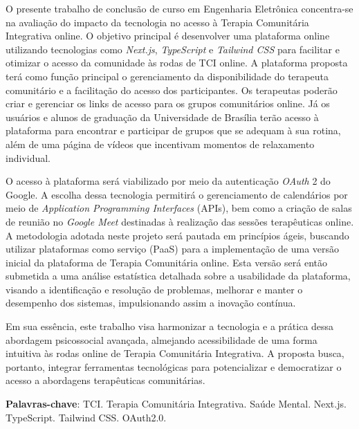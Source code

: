 \begin{resumo}
    O presente trabalho de conclusão de curso em Engenharia Eletrônica concentra-se na avaliação do impacto da tecnologia no acesso à Terapia Comunitária Integrativa online. O objetivo principal é desenvolver uma plataforma online utilizando tecnologias como \textit{Next.js}, \textit{TypeScript} e \textit{Tailwind CSS} para facilitar e otimizar o acesso da comunidade às rodas de TCI online. A plataforma proposta terá como função principal o gerenciamento da disponibilidade do terapeuta comunitário e a facilitação do acesso dos participantes. Os terapeutas poderão criar e gerenciar os links de acesso para os grupos comunitários online. Já os usuários e alunos de graduação da Universidade de Brasília terão acesso à plataforma para encontrar e participar de grupos que se adequam à sua rotina, além de uma página de vídeos que incentivam momentos de relaxamento individual.

    O acesso à plataforma será viabilizado por meio da autenticação \textit{OAuth} 2 do Google. A escolha dessa tecnologia permitirá o gerenciamento de calendários por meio de \textit{Application Programming Interfaces} (APIs), bem como a criação de salas de reunião no \textit{Google Meet} destinadas à realização das sessões terapêuticas online. A metodologia adotada neste projeto será pautada em princípios ágeis, buscando utilizar plataformas como serviço (PaaS) para a implementação de uma versão inicial da plataforma de Terapia Comunitária online. Esta versão será então submetida a uma análise estatística detalhada sobre a usabilidade da plataforma, visando a identificação e resolução de problemas, melhorar e manter o desempenho dos sistemas, impulsionando assim a inovação contínua.

    Em sua essência, este trabalho visa harmonizar a tecnologia e a prática dessa abordagem psicossocial avançada, almejando acessibilidade de uma forma intuitiva às rodas online de Terapia Comunitária Integrativa. A proposta busca, portanto, integrar ferramentas tecnológicas para potencializar e democratizar o acesso a abordagens terapêuticas comunitárias.

 \vspace{\onelineskip}
    
 \noindent
 \textbf{Palavras-chave}: TCI. Terapia Comunitária Integrativa. Saúde Mental. Next.js. TypeScript. Tailwind CSS. OAuth2.0. 
\end{resumo}
